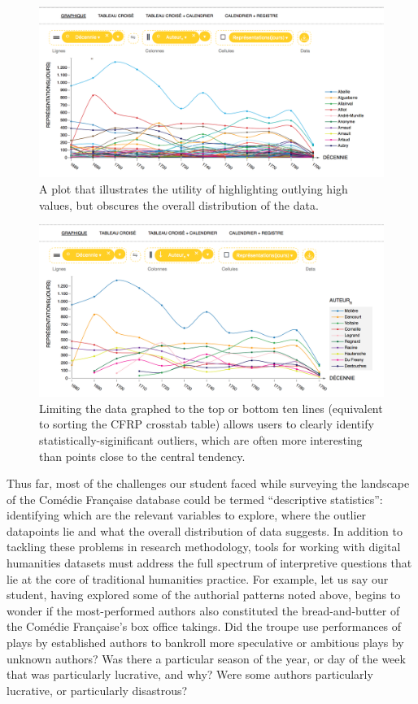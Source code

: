 \documentclass[	DIV=calc,%
							paper=a4,%
							fontsize=11pt,%
							twocolumn]{scrartcl}	 					%
\begin{document}
\begin{figure}
  \centering
	\includegraphics[width=7in]{steps/author-performances-all.png}
	\caption{\color{red}A plot that illustrates the utility of highlighting outlying high values, but obscures the overall distribution of the data.}
	\label{fig:author-performances-all}
\end{figure}

\begin{figure}
  \centering
	\includegraphics[width=7in]{steps/top-author-performances.png}
	\caption{Limiting the data graphed to the top or bottom ten lines (equivalent to sorting the CFRP crosstab table) allows users to clearly identify statistically-siginificant outliers, which are often more interesting than points close to the central tendency.}
	\label{fig:top-author-performances}
\end{figure}

Thus far, most of the challenges our student faced while surveying the landscape of the Comédie Française database could be termed ``descriptive statistics'': identifying which are the relevant variables to explore, where the outlier datapoints lie and what the overall distribution of data suggests.  In addition to tackling these problems in research methodology, tools for working with digital humanities datasets must address the full spectrum of interpretive questions that lie at the core of traditional humanities practice.  For example, let us say our student, having explored some of the authorial patterns noted above, begins to wonder if the most-performed authors also constituted the bread-and-butter of the Comédie Française's box office takings.  Did the troupe use performances of plays by established authors to bankroll more speculative or ambitious plays by unknown authors?  Was there a particular season of the year, or day of the week that was particularly lucrative, and why?  Were some authors particularly lucrative, or particularly disastrous?
\end{document}

